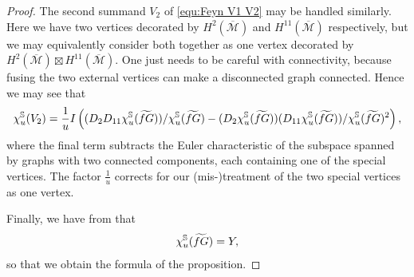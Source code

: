 \documentclass[12pt]{amsart}
\theoremstyle{definition}
\numberwithin{equation}{section}
\renewcommand{\ss}{\mathbb{S}}
\newcommand{\MM}{\overline{\mathcal{M}}}
\theoremstyle{definition} %
\theoremstyle{remark}
\begin{document}
\begin{proof}
The second summand $V_2$ of \eqref{equ:Feyn V1 V2} may be handled similarly.
Here we have two vertices decorated by $H^2(\MM)$ and $H^{11}(\MM)$ respectively, but we may equivalently consider both together as one vertex decorated by $H^2(\MM)\boxtimes H^{11}(\MM)$.
One just needs to be careful with connectivity, because fusing the two external vertices can make a disconnected graph connected.
Hence we may see that
\[
\chi^\ss_u(V_2) =
\frac1u
I\left( 
 (D_{2}D_{11}\chi_u^\ss(\fG))/\chi_u^\ss(\fG)
-
 (D_{2}\chi_u^\ss(\fG))(D_{11}\chi_u^\ss(\fG))/\chi_u^\ss(\fG)^2
\right),
\]
where the final term subtracts the Euler characteristic of the subspace spanned by graphs with two connected components, each containing one of the special vertices. The factor $\frac 1u$ corrects for our (mis-)treatment of the two special vertices as one vertex.

Finally, we have from \cite[Corollary 4.3]{PayneWillwacher24b} that 
\[
\chi_u^\ss(\fG) = Y,
\]
so that we obtain the formula of the proposition.
\end{proof}
\end{document}
